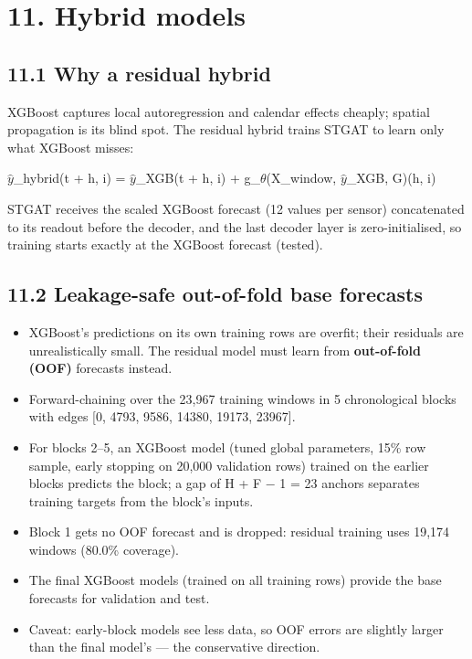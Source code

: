 \documentclass[10pt,a4paper]{article}
\begin{document}
\clearpage
\section*{11. Hybrid models}
\subsection*{11.1 Why a residual hybrid}
XGBoost captures local autoregression and calendar effects cheaply; spatial propagation is its blind spot. The residual hybrid trains STGAT to learn only what XGBoost misses:

\begin{eqbox}\ensuremath{\hat{y}}\_\allowbreak{}hybrid(t + h, i) = \ensuremath{\hat{y}}\_\allowbreak{}XGB(t + h, i) + g\_\allowbreak{}\ensuremath{\theta}(X\_\allowbreak{}window, \ensuremath{\hat{y}}\_\allowbreak{}XGB, G)(h, i)\end{eqbox}

STGAT receives the scaled XGBoost forecast (12 values per sensor) concatenated to its readout before the decoder, and the last decoder layer is zero-initialised, so training starts exactly at the XGBoost forecast (tested).

\subsection*{11.2 Leakage-safe out-of-fold base forecasts}
\begin{itemize}[nosep,leftmargin=*]
\item XGBoost's predictions on its own training rows are overfit; their residuals are unrealistically small. The residual model must learn from \textbf{out-of-fold (OOF)} forecasts instead.
\item Forward-chaining over the 23,967 training windows in 5 chronological blocks with edges [0, 4793, 9586, 14380, 19173, 23967].
\item For blocks 2--5, an XGBoost model (tuned global parameters, 15\% row sample, early stopping on 20,000 validation rows) trained on the earlier blocks predicts the block; a gap of H + F \ensuremath{-} 1 = 23 anchors separates training targets from the block's inputs.
\item Block 1 gets no OOF forecast and is dropped: residual training uses 19,174 windows (80.0\% coverage).
\item The final XGBoost models (trained on all training rows) provide the base forecasts for validation and test.
\item Caveat: early-block models see less data, so OOF errors are slightly larger than the final model's --- the conservative direction.
\end{itemize}
\end{document}
